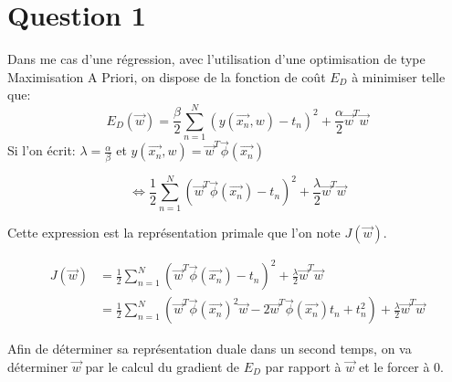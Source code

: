 \section{Question 1}
Dans me cas d'une régression, avec l'utilisation d'une optimisation de type Maximisation A Priori, on dispose de la fonction de coût $ E_D $ à minimiser telle que:
$$ E_D(\overrightarrow{w}) = \frac{\beta}{2} \sum_{n=1}^N \left(y(\overrightarrow{x_n}, w) - t_n \right)^2 + \frac{\alpha}{2} \overrightarrow{w}^T \overrightarrow{w} $$
Si l'on écrit: $ \lambda=\frac{\alpha}{\beta} $ et $ y(\overrightarrow{x_n}, w) = \overrightarrow{w}^T \overrightarrow{\phi}(\overrightarrow{x_n}) $
 
$$ \iff \frac{1}{2} \sum_{n=1}^N \left(\overrightarrow{w}^T \overrightarrow{\phi}(\overrightarrow{x_n}) - t_n \right)^2 + \frac{\lambda}{2} \overrightarrow{w}^T \overrightarrow{w} $$

Cette expression est la représentation primale que l'on note $ J(\overrightarrow{w}) $.

\begin{equation}
\begin{split}	
	J(\overrightarrow{w}) &= \frac{1}{2} \sum_{n=1}^N \left(\overrightarrow{w}^T \overrightarrow{\phi}(\overrightarrow{x_n}) - t_n \right)^2 + \frac{\lambda}{2} \overrightarrow{w}^T \overrightarrow{w} \\
	&= \frac{1}{2} \sum_{n=1}^N \left(\overrightarrow{w}^T \overrightarrow{\phi}(\overrightarrow{x_n})^2 \overrightarrow{w} - 2 \overrightarrow{w}^T \overrightarrow{\phi}(\overrightarrow{x_n}) t_n + t_n^2\right) + \frac{\lambda}{2} \overrightarrow{w}^T \overrightarrow{w}
\end{split}
\end{equation}

Afin de déterminer sa représentation duale dans un second temps, on va déterminer $ \overrightarrow{w} $  par le calcul du gradient de $E_D$  par rapport à $ \overrightarrow{w} $ et le forcer à 0.

